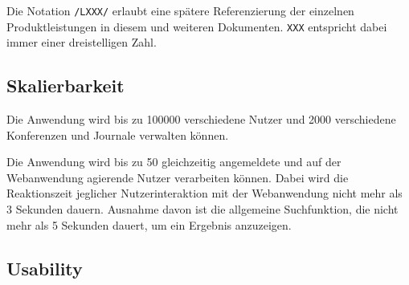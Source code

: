 
Die Notation \texttt{/LXXX/} erlaubt eine spätere Referenzierung der einzelnen Produktleistungen in diesem und weiteren
Dokumenten. \texttt{XXX} entspricht dabei immer einer dreistelligen Zahl.

\subsection{Skalierbarkeit}

\begin{description}

	 Die Anwendung wird bis zu 100000 verschiedene Nutzer und 2000 verschiedene Konferenzen und Journale verwalten können.

	 Die Anwendung wird bis zu 50 gleichzeitig angemeldete und auf der Webanwendung agierende Nutzer verarbeiten können. Dabei wird die Reaktionszeit jeglicher Nutzerinteraktion mit der Webanwendung nicht mehr als 3 Sekunden dauern. Ausnahme davon ist die allgemeine Suchfunktion, die nicht mehr als 5 Sekunden dauert, um ein Ergebnis anzuzeigen.

\end{description}

\subsection{Usability}

